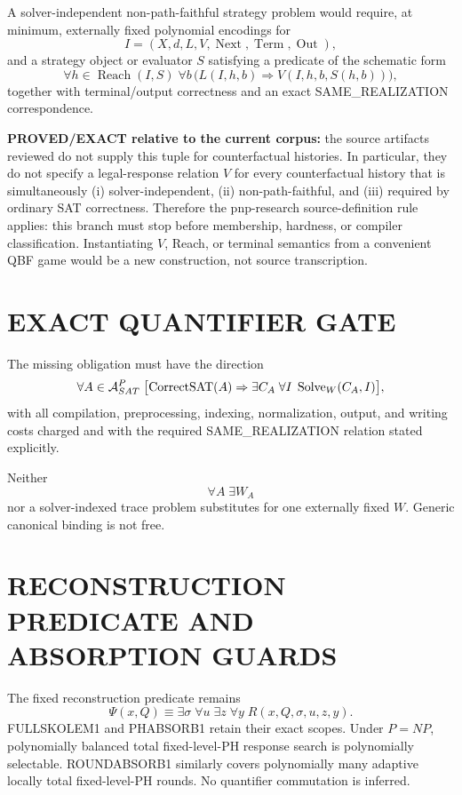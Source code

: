 \documentclass[11pt]{article}
\begin{document}
A solver-independent non-path-faithful strategy problem would require, at minimum, externally fixed polynomial encodings for
\[
I=(X,d,L,V,\operatorname{Next},\operatorname{Term},\operatorname{Out}),
\]
and a strategy object or evaluator $S$ satisfying a predicate of the schematic form
\[
\forall h\in\operatorname{Reach}(I,S)\;
\forall b\,
\bigl(L(I,h,b)\Rightarrow
V(I,h,b,S(h,b))\bigr),
\]
together with terminal/output correctness and an exact SAME\_REALIZATION correspondence.

\textbf{PROVED/EXACT relative to the current corpus:} the source artifacts reviewed do not supply this tuple for counterfactual histories. In particular, they do not specify a legal-response relation $V$ for every counterfactual history that is simultaneously (i) solver-independent, (ii) non-path-faithful, and (iii) required by ordinary SAT correctness. Therefore the pnp-research source-definition rule applies: this branch must stop before membership, hardness, or compiler classification. Instantiating $V$, Reach, or terminal semantics from a convenient QBF game would be a new construction, not source transcription.

\section*{EXACT QUANTIFIER GATE}
The missing obligation must have the direction
\[
\forall A\in{\cal A}^{P}_{SAT}\;
\bigl[\operatorname{CorrectSAT}(A)
\Rightarrow
\exists C_A\;
\forall I\;
\operatorname{Solve}_{W}(C_A,I)\bigr],
\]
with all compilation, preprocessing, indexing, normalization, output, and writing costs charged and with the required SAME\_REALIZATION relation stated explicitly.

Neither
\[
\forall A\;\exists W_A
\]
nor a solver-indexed trace problem substitutes for one externally fixed $W$. Generic canonical binding is not free.

\section*{RECONSTRUCTION PREDICATE AND ABSORPTION GUARDS}
The fixed reconstruction predicate remains
\[
\Psi(x,Q)\equiv
\exists\sigma\;\forall u\;\exists z\;\forall y\;
R(x,Q,\sigma,u,z,y).
\]
FULLSKOLEM1 and PHABSORB1 retain their exact scopes. Under $P=NP$, polynomially balanced total fixed-level-PH response search is polynomially selectable. ROUNDABSORB1 similarly covers polynomially many adaptive locally total fixed-level-PH rounds. No quantifier commutation is inferred.
\end{document}
